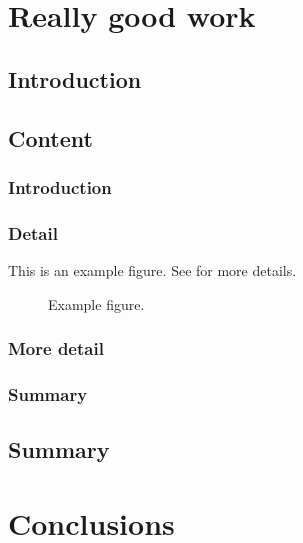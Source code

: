   
  
\chapter{Really good work}

  \section{Introduction}
  \lipsum[1] 
  
  \section{Content}
    \subsection{Introduction}
	\lipsum[1]
	
	\subsection{Detail}
    \lipsum[1-2] \cite{ref:jCAS10,ref:jCAS09,ref:jCAS09a} \lipsum[3-5] This is an example figure. See  for more details. 
	\begin{figure}
      \centering
      \caption{Example figure.}
      \label{fig:uom_logo}
    \end{figure} 
    
	\subsection{More detail}
	\lipsum[1-2] \cite{ref:jCAS10,ref:jCAS09,ref:jCAS09a} \lipsum[3-5]
	
	\subsection{Summary}
	\lipsum[1]
  
  \section{Summary}
  \lipsum[6]
 



\chapter{Conclusions}



